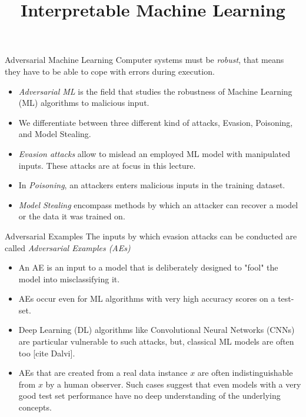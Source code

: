 \documentclass[11pt,compress,t,notes=noshow, xcolor=table]{beamer}
\title{Interpretable Machine Learning}
\institute{\href{https://compstat-lmu.github.io/lecture_i2ml/}{compstat-lmu.github.io/lecture\_i2ml}}
\date{}
\begin{document}
\newcommand{\vertiii}[1]{{\left\vert\kern-0.25ex\left\vert\kern-0.25ex\left\vert #1 
    \right\vert\kern-0.25ex\right\vert\kern-0.25ex\right\vert}}



%
%



\begin{vbframe}{Adversarial Machine Learning}
Computer systems must be \emph{robust}, that means they have to be able to cope with errors during execution.
\begin{itemize}
\item \emph{Adversarial ML} is the field that studies the robustness of Machine Learning (ML) algorithms to malicious input.
\item We differentiate between three different kind of attacks, Evasion, Poisoning, and Model Stealing.
\item \emph{Evasion attacks} allow to mislead an employed ML model with manipulated inputs. These attacks are at focus in this lecture.
\item In \emph{Poisoning}, an attackers enters malicious inputs in the training dataset.
\item \emph{Model Stealing} encompass methods by which an attacker can recover a model or the data it was trained on.
\end{itemize}
\end{vbframe}

\begin{vbframe}{Adversarial Examples}
The inputs by which evasion attacks can be conducted are called \emph{Adversarial Examples (AEs)}
\begin{itemize}
\item An AE is an input to a model that is deliberately designed to "fool" the model into misclassifying it.
\item AEs occur even for ML algorithms with very high accuracy scores on a test-set.
\item Deep Learning (DL) algorithms like Convolutional Neural Networks (CNNs) are particular vulnerable to such attacks, but, classical ML models are often too [cite Dalvi].
\item AEs that are created from a real data instance $x$ are often indistinguishable from $x$ by a human observer. Such cases suggest that even models with a very good test set performance have no deep understanding of the underlying concepts.%
\end{itemize}
\end{vbframe}
\end{document}
